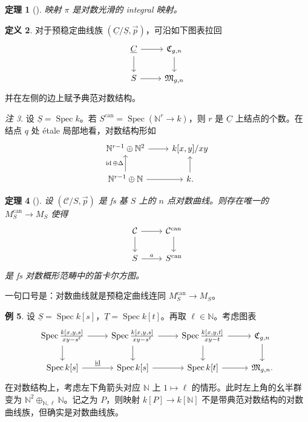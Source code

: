 \documentclass{amsart}
\newtheorem{thm}{定理}[section]
\theoremstyle{definition}
\newtheorem{defn}[thm]{定义}
\newtheorem{exm}[thm]{例}
\theoremstyle{remark}
\newtheorem{rmk}[thm]{注}
\theoremstyle{plain}
\theoremstyle{definition}
\theoremstyle{remark}
\newcommand{\N}{\mathbb{N}}
\newcommand{\mc}[1]{\mathcal{#1}}
\newcommand{\mf}[1]{\mathfrak{#1}}
\newcommand{\on}[1]{\operatorname{#1}}
\newcommand{\ul}[1]{\underline{#1}}
\newcommand{\1}{\mathbf{1}}
\newcommand{\2}{\mathbf{2}}
\newcommand{\3}{\mathbf{3}}
\DeclareMathOperator{\Spec}{Spec}
\begin{document}
\begin{thm}[{\cite{FKato2000}}]
    映射 \(\pi\) 是对数光滑的 integral 映射。
\end{thm}

\begin{defn}
    对于预稳定曲线族 \((\ul{C}/\ul{S}, \vec{p})\)，可沿如下图表拉回
    \begin{equation*}
    \begin{tikzcd}
        \ul{C} \ar{r} \ar{d} & \mf{C}_{g,n} \ar{d} \\
        S \ar{r} & \mf{M}_{g,n}
    \end{tikzcd}
    \end{equation*}
    并在左侧的边上赋予典范对数结构。
\end{defn}

\begin{rmk}
    设 \(\ul{S} = \Spec k\)。若 \(S^{\on{can}} = \Spec (\N^r \to k)\)，则 \(r\) 是 \(\ul{C}\) 上结点的个数。在结点 \(q\) 处 \'etale 局部地看，对数结构形如
    \begin{equation*}
    \begin{tikzcd}
        \N^{r-1} \oplus \N^2 \ar{r} & k[x,y]/xy \\
        \N^{r-1} \oplus \N \ar{u}{\on{id}\oplus\Delta} \ar{r} & k \ar{u}.
    \end{tikzcd}
    \end{equation*}
\end{rmk}

\begin{thm}[{\cite{FKato2000}}]
    设 \((\mc{C}/S, \vec{p})\) 是 fs 基 \(S\) 上的 \(n\) 点对数曲线。则存在唯一的 \(M_S^{\on{can}} \to M_S\) 使得
    \begin{equation*}
    \begin{tikzcd}
        \mc{C} \ar{d} \ar{r} & \mc{C}^{\on{can}} \ar{d} \\
        S \ar{r}{a} & S^{\on{can}}
    \end{tikzcd}
    \end{equation*}
    是 fs 对数概形范畴中的笛卡尔方图。
\end{thm}

一句口号是：对数曲线就是预稳定曲线连同 \(M_S^{\on{can}} \to M_S\)。

\begin{exm}
    设 \(\ul{S} = \Spec k[s]\)，\(\ul{T} = \Spec k[t]\)。再取 \(\ell \in \N\)。考虑图表
    \begin{equation*}
    \begin{tikzcd}
        \Spec \frac{k{ [x,y,s] }}{xy-s^{\ell}} \ar{d} \ar{r} & \Spec \frac{k{ [x,y,s] }}{xy-s^{\ell}} \ar{d} \ar{r} & \Spec  \frac{k{[x,y,t]}}{xy-t} \ar{r}\ar{d} & \mf{C}_{g,n} \ar{d} \\
        \Spec k{[s]} \ar{r}{\ul{ \on{id} }} & \Spec {k[s]} \ar{r} & \Spec k{[t]} \ar{r} & \mf{M}_{g,n}.
    \end{tikzcd}
    \end{equation*}
    在对数结构上，考虑左下角箭头对应 \(\N\) 上 \(1 \mapsto \ell\) 的情形。此时左上角的幺半群变为 \(\N^2 \oplus_{\N, \ell} \N\)。记之为 \(P\)，则映射 \(k[P] \to k[\N]\) 不是带典范对数结构的对数曲线族，但确实是对数曲线族。
\end{exm}
\end{document}
